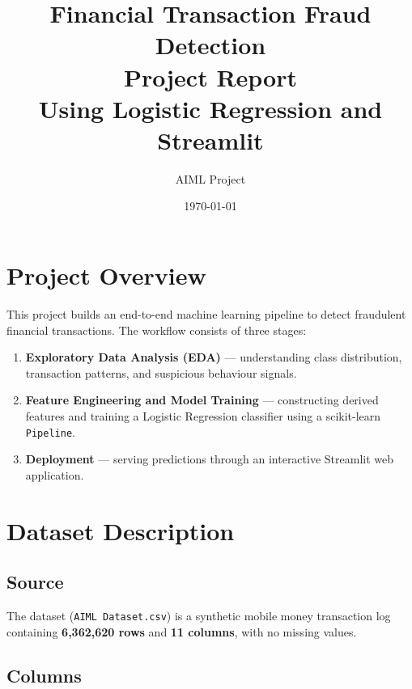 \documentclass[12pt, a4paper]{article}
\title{
    \vspace{-1cm}
    \textbf{Financial Transaction Fraud Detection} \\[0.5em]
    \large Project Report \\[0.3em]
    \normalsize Using Logistic Regression and Streamlit
}
\author{AIML Project}
\date{\today}
\begin{document}
\maketitle
\thispagestyle{fancy}
\tableofcontents
\newpage

\section{Project Overview}

This project builds an end-to-end machine learning pipeline to detect fraudulent financial transactions. The workflow consists of three stages:

\begin{enumerate}[label=\textbf{\arabic*.}]
    \item \textbf{Exploratory Data Analysis (EDA)} — understanding class distribution, transaction patterns, and suspicious behaviour signals.
    \item \textbf{Feature Engineering and Model Training} — constructing derived features and training a Logistic Regression classifier using a scikit-learn \texttt{Pipeline}.
    \item \textbf{Deployment} — serving predictions through an interactive Streamlit web application.
\end{enumerate}

\section{Dataset Description}

\subsection{Source}

The dataset (\texttt{AIML Dataset.csv}) is a synthetic mobile money transaction log containing \textbf{6,362,620 rows} and \textbf{11 columns}, with no missing values.

\subsection{Columns}
\end{document}
